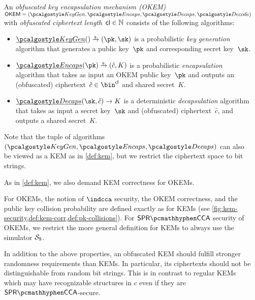 \begin{definition}
    \label{def:okem}
    An \emph{obfuscated key encapsulation mechanism (OKEM)} $\OKEM = (\kgen, \encaps, \decaps, \decode)$ with \emph{obfuscated ciphertext length}~$\mathsf{cl} \in \mathbb{N}$ consists of the following algorithms:
    \begin{itemize}
        \item $\ul{\kgen}() \tor (\pk,\sk)$ is a probabilistic \emph{key generation} algorithm that generates a public key~$\pk$ and corresponding secret key~$\sk$.

        \item $\ul{\encaps}(\pk) \tor (\hat c, K)$ is a probabilistic \emph{encapsulation} algorithm that takes as input an OKEM public key~$\pk$ and outputs an (obfuscated) ciphertext~$\hat c \in \bin^\obfctxtlen$ and shared secret~$K$.

        \item $\ul{\decaps}(\sk,\hat c) \to K$ is a deterministic \emph{decapsulation} algorithm that takes as input a secret key~$\sk$ and (obfuscated) ciphertext~$\hat c$, and outputs a shared secret~$K$.
    \end{itemize}
    Note that the tuple of algorithms $(\kgen, \encaps, \decaps)$ can also be viewed as a KEM as in \cref{def:kem}, but we restrict the ciphertext space to bit strings.

    As in \cref{def:kem}, we also demand KEM correctness for OKEMs.
\end{definition}

For OKEMs, the notion of $\indcca$ security, the OKEM correctness, and the public key collision probability are defined exactly as for KEMs (see \cref{fig:kem-security,def:kem-corr,def:pk-collisions}). For $\sprcca$ security of OKEMs, we restrict the more general definition for KEMs to always use the simulator $\simulbin$.

In addition to the above properties, an obfuscated KEM should fulfill stronger randomness requirements than KEMs. In particular, its ciphertexts should not be distinguishable from random bit strings. This is in contrast to regular KEMs which may have recognizable structures in $c$ even if they are $\sprcca$-secure.


